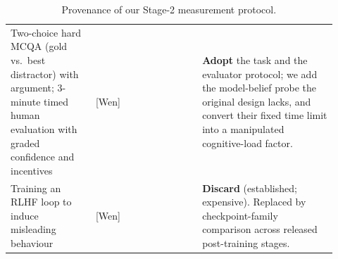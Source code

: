 \documentclass[11pt]{article}
\begin{document}
\begin{table}[h]
\begin{tabular}{p{0.24\linewidth}p{0.30\linewidth}p{0.38\linewidth}}
\addlinespace
Two-choice hard MCQA (gold vs.\ best distractor) with argument;
3-minute timed human evaluation with graded confidence and incentives
 & [Wen] & \textbf{Adopt} the task and the evaluator protocol; we add
   the model-belief probe the original design lacks, and convert their
   fixed time limit into a manipulated cognitive-load factor. \\
\addlinespace
Training an RLHF loop to induce misleading behaviour
 & [Wen] & \textbf{Discard} (established; expensive). Replaced by
   checkpoint-family comparison across released post-training stages. \\
\bottomrule
\end{tabular}
\caption{Provenance of our Stage-2 measurement protocol.}
\end{table}
\end{document}
